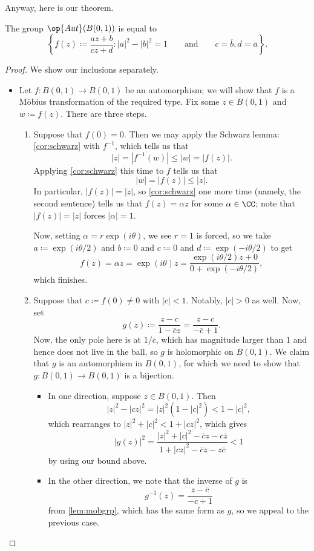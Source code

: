 Anyway, here is our theorem.
\begin{theorem}
	The group $\op{Aut}(B(0,1))$ is equal to
	\[\left\{f(z)\coloneqq\frac{az+b}{cz+d}:|a|^2-|b|^2=1\qquad\text{and}\qquad c=\overline b,d=\overline a\right\}.\]
\end{theorem}
\begin{proof}
	We show our inclusions separately.
	\begin{itemize}
		\item Let $f\colon B(0,1)\to B(0,1)$ be an automorphism; we will show that $f$ is a M\"obius transformation of the required type. Fix some $z\in B(0,1)$ and $w\coloneqq f(z)$. There are three steps.
		\begin{enumerate}
			\item Suppose that $f(0)=0$. Then we may apply the Schwarz lemma: \autoref{cor:schwarz} with $f^{-1}$, which tells us that
			\[|z|=\left|f^{-1}(w)\right|\le|w|=|f(z)|.\]
			Applying \autoref{cor:schwarz} this time to $f$ tells us that
			\[|w|=|f(z)|\le|z|.\]
			In particular, $|f(z)|=|z|$, so \autoref{cor:schwarz} one more time (namely, the second sentence) tells us that $f(z)=\alpha z$ for some $\alpha\in\CC$; note that $|f(z)|=|z|$ forces $|\alpha|=1$.

			Now, setting $\alpha=r\exp(i\theta)$, we see $r=1$ is forced, so we take $a\coloneqq\exp(i\theta/2)$ and $b\coloneqq0$ and $c\coloneqq0$ and $d\coloneqq\exp(-i\theta/2)$ to get
			\[f(z)=\alpha z=\exp(i\theta)z=\frac{\exp(i\theta/2)z+0}{0+\exp(-i\theta/2)},\]
			which finishes.

			\item Suppose that $c\coloneqq f(0)\ne0$ with $|c|<1$. Notably, $|c|>0$ as well. Now, set
			\[g(z)\coloneqq\frac{z-c}{1-\overline cz}=\frac{z-c}{-\overline c+1}.\]
			Now, the only pole here is at $1/\overline c$, which has magnitude larger than $1$ and hence does not live in the ball, so $g$ is holomorphic on $B(0,1)$. We claim that $g$ is an automorphism in $B(0,1)$, for which we need to show that $g\colon B(0,1)\to B(0,1)$ is a bijection.
			\begin{itemize}
				\item In one direction, suppose $z\in B(0,1)$. Then
				\[|z|^2-|cz|^2=|z|^2\left(1-|c|^2\right)<1-|c|^2,\]
				which rearranges to $|z|^2+|c|^2<1+|cz|^2$, which gives
				\[|g(z)|^2=\frac{|z|^2+|c|^2-\overline cz-c\overline z}{1+|cz|^2-\overline cz-z\overline c}<1\]
				by using our bound above.
				\item In the other direction, we note that the inverse of $g$ is
				\[g^{-1}(z)=\frac{z-\overline c}{-c+1}\]
				from \autoref{lem:mobgrp}, which has the same form as $g$, so we appeal to the previous case.
			\end{itemize}


\end{enumerate}
\end{itemize}
\end{proof}
